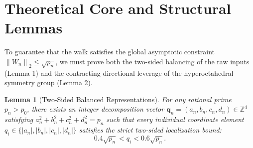 \documentclass[11pt,a4paper]{article}
\newtheorem{lemma}{Lemma}
\newcommand{\Z}{\mathbb{Z}}
\newcommand{\norm}[1]{\left\lVert#1\right\rVert}
\begin{document}
\section{Theoretical Core and Structural Lemmas}

To guarantee that the walk satisfies the global asymptotic constraint $\norm{W_n}_2 \le \sqrt{p_n}$, we must prove both the two-sided balancing of the raw inputs (Lemma 1) and the contracting directional leverage of the hyperoctahedral symmetry group (Lemma 2).

\begin{lemma}[Two-Sided Balanced Representations]
For any rational prime $p_n > p_0$, there exists an integer decomposition vector $\mathbf{q}_n = (a_n, b_n, c_n, d_n) \in \Z^4$ satisfying $a_n^2 + b_n^2 + c_n^2 + d_n^2 = p_n$ such that every individual coordinate element $q_i \in \{|a_n|, |b_n|, |c_n|, |d_n|\}$ satisfies the strict two-sided localization bound:
\begin{equation}
    0.4 \sqrt{p_n} < q_i < 0.6 \sqrt{p_n}.
\end{equation}
\end{lemma}
\end{document}
